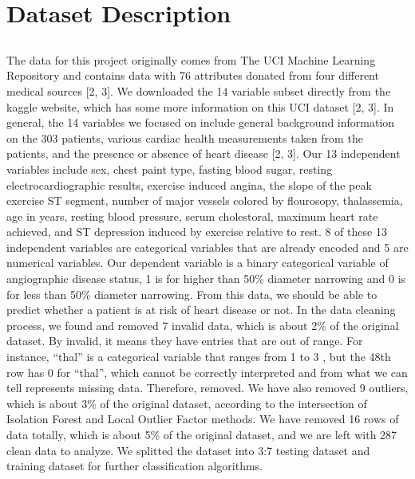 \documentclass[12pt]{article}
\begin{document}
\section*{Dataset Description}
\subsection*{}
The data for this project originally comes from The UCI Machine Learning Repository and contains data with 76 attributes donated from four different medical sources [2, 3].  We downloaded the 14 variable subset directly from the kaggle website, which has some more information on this UCI dataset [2, 3]. In general, the 14 variables we focused on include general background information on the 303 patients, various cardiac health measurements taken from the patients, and the presence or absence of heart disease [2, 3]. 
Our 13 independent variables include sex, chest paint type, fasting blood sugar, resting electrocardiographic results, exercise induced angina, the slope of the peak exercise ST segment, number of major vessels colored by flourosopy, thalassemia, age in years, resting blood pressure, serum cholestoral, maximum heart rate achieved, and ST depression induced by exercise relative to rest. 8 of these 13 independent variables are categorical variables that are already encoded and 5 are numerical variables. Our dependent variable is a binary categorical variable of angiographic disease status, 1 is for higher than 50\% diameter narrowing and 0 is for less than 50\% diameter narrowing. From this data, we should be able to predict whether a patient is at risk of heart disease or not. 
In the data cleaning process, we found and removed 7 invalid data, which is about 2\% of the original dataset. By invalid, it means they have entries that are out of range. For instance, “thal” is a categorical variable that ranges from 1 to 3 , but the 48th row has 0 for “thal”, which cannot be correctly interpreted and from what we can tell represents missing data. Therefore, removed. We have also removed 9 outliers, which is about 3\% of the original dataset, according to the intersection of Isolation Forest and Local Outlier Factor methods. We have removed 16 rows of data totally, which is about 5\% of the original dataset, and we are left with 287 clean data to analyze. 
We splitted the dataset into 3:7 testing dataset and training dataset for further classification algorithms.
\end{document}
